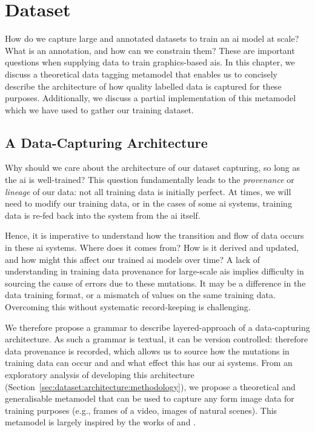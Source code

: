 \chapter{Dataset}
\label{ch:dataset}

How do we capture large and annotated datasets to train an \gls{ai} model at scale? What is an annotation, and how can we constrain them? These are important questions when supplying data to train graphics-based \glspl{ai}. In this chapter, we discuss a theoretical data tagging metamodel that enables us to concisely describe the architecture of how quality labelled data is captured for these purposes. Additionally, we discuss a partial implementation of this metamodel which we have used to gather our training dataset.

\section{A Data-Capturing Architecture}
\label{sec:dataset:architecture}

Why should we care about the architecture of our dataset capturing, so long as the \gls{ai} is well-trained? This question fundamentally leads to the \textit{provenance} or \textit{lineage} of our data: not all training data is initially perfect. At times, we will need to modify our training data, or in the cases of some \gls{ai} systems, training data is re-fed back into the system from the \gls{ai} itself. 

Hence, it is imperative to understand how the transition and flow of data occurs \citep{Cui:2003im,Ikeda:2009ca,Buneman:2000bn} in these \gls{ai} systems. Where does it comes from? How is it derived and updated, and how might this affect our trained \gls{ai} models over time? A lack of understanding in training data provenance for large-scale \glspl{ai} implies difficulty in sourcing the cause of errors due to these mutations. It may be a difference in the data training format, or a mismatch of values on the same training data. Overcoming this without systematic record-keeping is challenging.

We therefore propose a grammar to describe layered-approach of a data-capturing architecture. As such a grammar is textual, it can be version controlled: therefore data provenance is recorded, which allows us to source how the mutations in training data can occur and and what effect this has our \gls{ai} systems. From an exploratory analysis of developing this architecture (Section~\ref{sec:dataset:architecture:methodology}), we propose a theoretical and generalisable metamodel that can be used to capture any form image data for training purposes (e.g., frames of a video, images of natural scenes). This metamodel is largely inspired by the works of \citet{Wickham:2010hy, Wickham:2007tu} and \citet{Moody:2009vo}.

